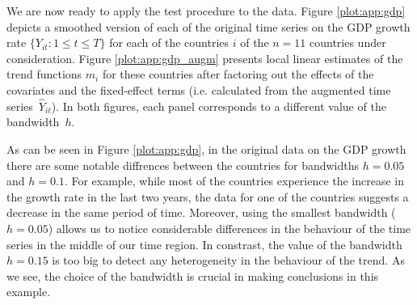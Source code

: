 \documentclass[a4paper,12pt]{article}
\begin{document}
{ %


We are now ready to apply the test procedure to the data. Figure \ref{plot:app:gdp} depicts a smoothed version of each of the original time series on the GDP growth rate $\{Y_{it}: 1 \le t \le T\}$ for each of the countries $i$ of the $n=11$ countries under consideration. Figure \ref{plot:app:gdp_augm} presents local linear estimates of the trend functions $m_i$ for these countries after factoring out the effects of the covariates and the fixed-effect terms (i.e. calculated from the augmented time series~$\widehat{Y}_{it}$). In both figures, each panel corresponds to a different value of the bandwidth~$h$.

As can be seen in Figure \ref{plot:app:gdp}, in the original data on the GDP growth there are some notable diffrences between the countries for bandwidths $h = 0.05$ and $h = 0.1$. For example, while most of the countries experience the increase in the growth rate in the last two years, the data for one of the countries suggests a decrease in the same period of time. Moreover, using the smallest bandwidth ($h= 0.05$) allows us to notice considerable differences in the behaviour of the time series in the middle of our time region. In constrast, the value of the bandwidth $h = 0.15$ is too big to detect any heterogeneity in the behaviour of the trend. As we see, the choice of the bandwidth is crucial in making conclusions in this example.

}
\end{document}
